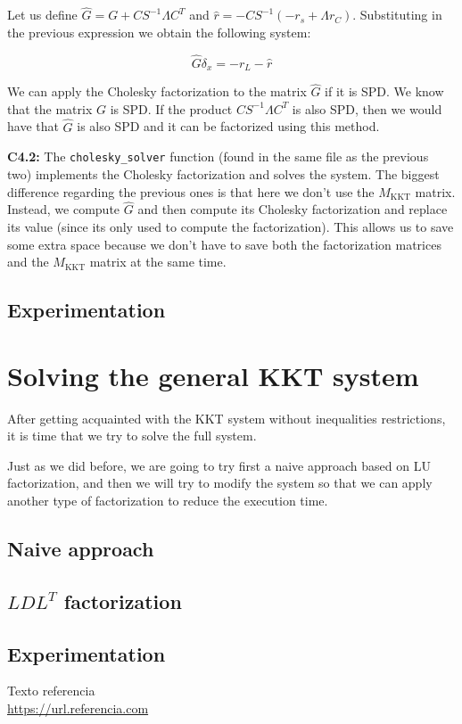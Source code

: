 \documentclass[11pt,a4paper]{article}
\begin{document}
Let us define $\hat{G} = G + CS^{-1}\Lambda C^T$ and $\hat{r} = -CS^{-1}(-r_s + \Lambda r_C)$.
Substituting in the previous expression we obtain the following system:

\[
  \hat{G} \delta_x = -r_L - \hat{r}
\]

We can apply the Cholesky factorization to the matrix $\hat{G}$ if it is SPD. We know that the matrix
$G$ is SPD. If the product $CS^{-1}\Lambda C^T$ is also SPD, then we would have that $\hat{G}$
is also SPD and it can be factorized using this method.

\noindent \textbf{C4.2:} The \texttt{cholesky\_solver} function (found in the same file
as the previous two) implements the Cholesky factorization and solves the system. The biggest
difference regarding the previous ones is that here we don't use the $M_{\text{KKT}}$ matrix.
Instead, we compute $\hat{G}$ and then compute its Cholesky factorization and replace its value
(since its only used to compute the factorization). This allows us to save some extra space because
we don't have to save both the factorization matrices and the $M_{\text{KKT}}$ matrix at
the same time.

\subsection{Experimentation}

\section{Solving the general KKT system}

After getting acquainted with the KKT system without inequalities restrictions, it is
time that we try to solve the full system.

Just as we did before, we are going to try first a naive approach based on LU factorization, and
then we will try to modify the system so that we can apply another type of factorization to reduce
the execution time.

\subsection{Naive approach}



\subsection{$LDL^T$ factorization}

\subsection{Experimentation}

\newpage

\begin{thebibliography}{5}

Texto referencia
\\\url{https://url.referencia.com}

\end{thebibliography}
\end{document}
